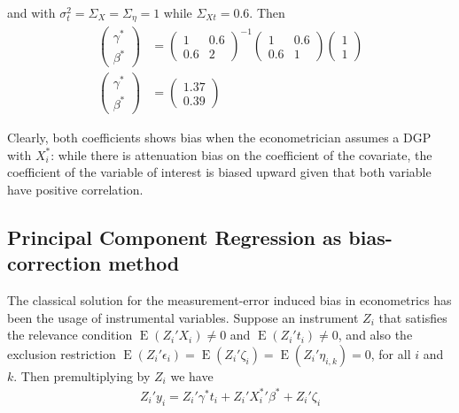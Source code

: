 \documentclass[12pt]{article}
\begin{document}
    and with $\sigma^2_t=\Sigma_X=\Sigma_\eta=1$ while $\Sigma_{Xt}=0.6$. Then
    \begin{align*}
        \left(\begin{array}{l}
    {\gamma}^* \\
    {\beta}^*
    \end{array}\right)& =\left(\begin{array}{cc}
    1 & 0.6 \\
    0.6 & 2
    \end{array}\right)^{-1}\left(\begin{array}{cc}
    1 & 0.6 \\
    0.6 & 1
    \end{array}\right)\left(\begin{array}{l}
    1\\
    1
    \end{array}\right) \\
    \left(\begin{array}{l}
    {\gamma}^* \\
    {\beta}^*
    \end{array}\right)&=\left(\begin{array}{l}
    1.37 \\
    0.39
    \end{array}\right)
    \end{align*}

    Clearly, both coefficients shows bias when the econometrician assumes a DGP with $X_i^*$: while there is attenuation bias on the coefficient of the covariate, the coefficient of the variable of interest is biased upward given that both variable have positive correlation.

    \subsection{Principal Component Regression as bias-correction method}

    The classical solution for the measurement-error induced bias in econometrics has been the usage of instrumental variables. Suppose an instrument $Z_i$ that satisfies the relevance condition $\operatorname{E}(Z_i'X_i)\neq 0$ and $\operatorname{E}(Z_i't_i)\neq 0$, and also the exclusion restriction $\operatorname{E}(Z_i'\epsilon_i)=\operatorname{E}(Z_i'\zeta_i)=\operatorname{E}(Z_i'\eta_{i,k})=0$, for all $i$ and $k$. Then premultiplying by $Z_i$ we have
    \begin{align}
        Z_i'y_i =  Z_i'\gamma^* t_i +  Z_i'{X^{*}_i}' \beta^* +  Z_i'\zeta_i
    \end{align}
\end{document}

